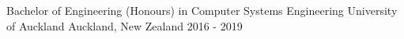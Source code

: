 

\begin{cventries}

  \cventry
    {Bachelor of Engineering (Honours) in Computer Systems Engineering} %
    {University of Auckland} %
    {Auckland, New Zealand} %
    {2016 - 2019} %
    {
    }

\end{cventries}

